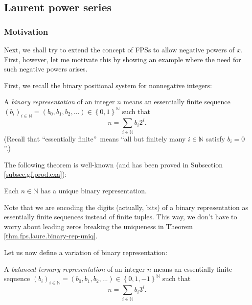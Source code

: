 \subsection{\label{sec.gf.laure}Laurent power series}

\subsubsection{Motivation}

Next, we shall try to extend the concept of FPSs to allow negative powers of
$x$. First, however, let me motivate this by showing an example where the need
for such negative powers arises.

First, we recall the binary positional system for nonnegative integers:

\begin{definition}
A \emph{binary representation} of an integer $n$ means an essentially finite
sequence $\left(  b_{i}\right)  _{i\in\mathbb{N}}=\left(  b_{0},b_{1}%
,b_{2},\ldots\right)  \in\left\{  0,1\right\}  ^{\mathbb{N}}$ such that%
\[
n=\sum_{i\in\mathbb{N}}b_{i}2^{i}.
\]
(Recall that \textquotedblleft essentially finite\textquotedblright\ means
\textquotedblleft all but finitely many $i\in\mathbb{N}$ satisfy $b_{i}%
=0$\textquotedblright.)
\end{definition}

The following theorem is well-known (and has been proved in Subsection
\ref{subsec.gf.prod.exa}):

\begin{theorem}
\label{thm.fps.laure.binary-rep-uniq}Each $n\in\mathbb{N}$ has a unique binary representation.
\end{theorem}

Note that we are encoding the digits (actually, bits) of a binary
representation as essentially finite sequences instead of finite tuples. This
way, we don't have to worry about leading zeros breaking the uniqueness in
Theorem \ref{thm.fps.laure.binary-rep-uniq}. \medskip

Let us now define a variation of binary representation:

\begin{definition}
A \emph{balanced ternary representation} of an integer $n$ means an
essentially finite sequence $\left(  b_{i}\right)  _{i\in\mathbb{N}}=\left(
b_{0},b_{1},b_{2},\ldots\right)  \in\left\{  0,1,-1\right\}  ^{\mathbb{N}}$
such that%
\[
n=\sum_{i\in\mathbb{N}}b_{i}3^{i}.
\]

\end{definition}


